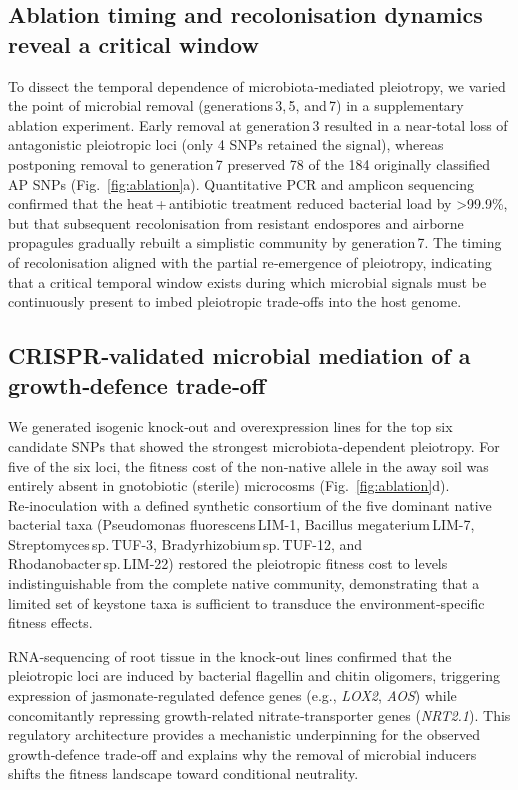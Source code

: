 \documentclass{article}
\begin{document}
\subsection{Ablation timing and recolonisation dynamics reveal a critical window}

To dissect the temporal dependence of microbiota‑mediated pleiotropy, we varied the point of microbial removal (generations 3, 5, and 7) in a supplementary ablation experiment.  
Early removal at generation 3 resulted in a near‑total loss of antagonistic pleiotropic loci (only 4 SNPs retained the signal), whereas postponing removal to generation 7 preserved 78 of the 184 originally classified AP SNPs (Fig.~\ref{fig:ablation}a).  
Quantitative PCR and amplicon sequencing confirmed that the heat + antibiotic treatment reduced bacterial load by >99.9\%, but that subsequent recolonisation from resistant endospores and airborne propagules gradually rebuilt a simplistic community by generation 7.  
The timing of recolonisation aligned with the partial re‑emergence of pleiotropy, indicating that a critical temporal window exists during which microbial signals must be continuously present to imbed pleiotropic trade‑offs into the host genome.

\subsection{CRISPR‑validated microbial mediation of a growth‑defence trade‑off}

We generated isogenic knock‑out and overexpression lines for the top six candidate SNPs that showed the strongest microbiota‑dependent pleiotropy.  
For five of the six loci, the fitness cost of the non‑native allele in the away soil was entirely absent in gnotobiotic (sterile) microcosms (Fig.~\ref{fig:ablation}d).  
Re‑inoculation with a defined synthetic consortium of the five dominant native bacterial taxa (Pseudomonas fluorescens LIM-1, Bacillus megaterium LIM-7, Streptomyces sp. TUF-3, Bradyrhizobium sp. TUF-12, and Rhodanobacter sp. LIM-22) restored the pleiotropic fitness cost to levels indistinguishable from the complete native community, demonstrating that a limited set of keystone taxa is sufficient to transduce the environment‑specific fitness effects.

RNA‑sequencing of root tissue in the knock‑out lines confirmed that the pleiotropic loci are induced by bacterial flagellin and chitin oligomers, triggering expression of jasmonate‑regulated defence genes (e.g., \textit{LOX2}, \textit{AOS}) while concomitantly repressing growth‑related nitrate‑transporter genes (\textit{NRT2.1}). This regulatory architecture provides a mechanistic underpinning for the observed growth‑defence trade‑off and explains why the removal of microbial inducers shifts the fitness landscape toward conditional neutrality.
\end{document}
